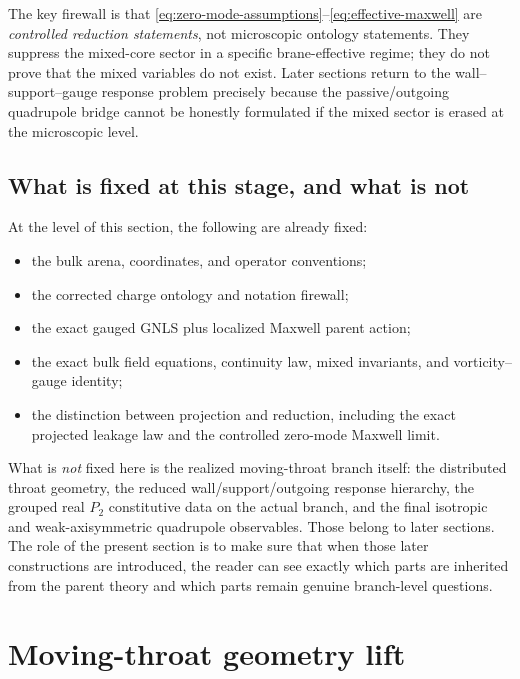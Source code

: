 \documentclass[11pt]{article}
\theoremstyle{definition}
\begin{document}
The key firewall is that \eqref{eq:zero-mode-assumptions}--\eqref{eq:effective-maxwell} are \emph{controlled reduction statements}, not microscopic ontology statements. They suppress the mixed-core sector in a specific brane-effective regime; they do not prove that the mixed variables do not exist. Later sections return to the wall--support--gauge response problem precisely because the passive/outgoing quadrupole bridge cannot be honestly formulated if the mixed sector is erased at the microscopic level.

\subsection{What is fixed at this stage, and what is not}

At the level of this section, the following are already fixed:
\begin{itemize}
    \item the bulk arena, coordinates, and operator conventions;
    \item the corrected charge ontology and notation firewall;
    \item the exact gauged GNLS plus localized Maxwell parent action;
    \item the exact bulk field equations, continuity law, mixed invariants, and vorticity--gauge identity;
    \item the distinction between projection and reduction, including the exact projected leakage law and the controlled zero-mode Maxwell limit.
\end{itemize}
What is \emph{not} fixed here is the realized moving-throat branch itself: the distributed throat geometry, the reduced wall/support/outgoing response hierarchy, the grouped real \(P_2\) constitutive data on the actual branch, and the final isotropic and weak-axisymmetric quadrupole observables. Those belong to later sections. The role of the present section is to make sure that when those later constructions are introduced, the reader can see exactly which parts are inherited from the parent theory and which parts remain genuine branch-level questions.

\section{Moving-throat geometry lift}
\label{sec:geometry-lift}
\end{document}
